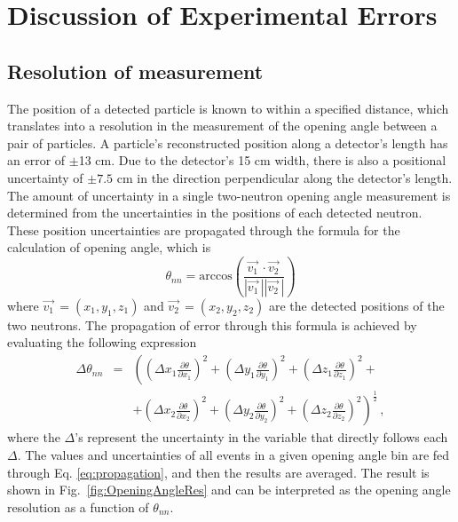 \chapter{Discussion of Experimental Errors}
\label{Errors}
\section{Resolution of measurement}
The position of a detected particle is known to within a specified distance, which translates into a resolution in the measurement of the opening angle between a pair of particles.
A particle's reconstructed position along a detector's length has an error of $\pm$13 cm.
Due to the detector's 15 cm width, there is also a positional uncertainty of $\pm 7.5$ cm in the direction perpendicular along the detector's length.
The amount of uncertainty in a single two-neutron opening angle measurement is determined from the uncertainties in the positions of each detected neutron.
These position uncertainties are propagated through the formula for the calculation of opening angle, which is
\begin{displaymath}
    \theta_{nn} = \text{arccos}\left(\frac{\vec{v_{1}}^{\,}\cdot\vec{v_{2}}^{\,}}{|\vec{v_{1}}^{\,}||\vec{v_{2}}^{\,}|}\right)
\end{displaymath}
where $\vec{v_{1}}^{\,} = (x_1,y_1,z_1)$ and $\vec{v_{2}}^{\,} = (x_2,y_2,z_2)$ are the detected positions of the two neutrons.
The propagation of error through this formula is achieved by evaluating the following expression
\begin{eqnarray}
\label{eq:propagation}
 \Delta \theta_{nn} & = & \left( \left(\Delta x_1 \frac{\partial \theta}{\partial x_1}\right)^{2} + \left(\Delta y_1 \frac{\partial \theta}{\partial y_1}\right)^{2} + \left(\Delta z_1 \frac{\partial \theta}{\partial z_1}\right)^{2} + \right. \\
 & & \left. + \left(\Delta x_2 \frac{\partial \theta}{\partial x_2}\right)^{2} + \left(\Delta y_2\frac{\partial \theta}{\partial y_2}\right)^{2} + \left(\Delta z_2 \frac{\partial \theta}{\partial z_2}\right)^{2} \right) ^{\frac{1}{2}} \, ,  \nonumber
\end{eqnarray}
where the $\Delta$'s represent the uncertainty in the variable that directly follows each $\Delta$.
The values and uncertainties of all events in a given opening angle bin are fed through Eq. \ref{eq:propagation}, and then the results are averaged.
The result is shown in Fig.~\ref{fig:OpeningAngleRes} and can be interpreted as the opening angle resolution as a function of $\theta_{nn}$.
